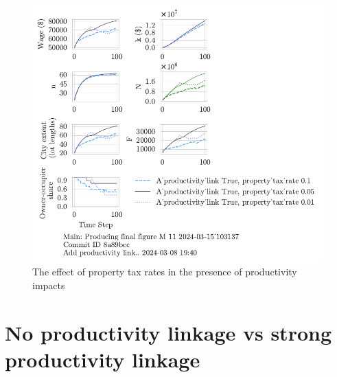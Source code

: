 {%
\begin{figure}[h!tb] 
    \centering
    \includegraphics[scale=.8, trim={0 1.4cm 0 0},clip]{fig/With-productivity_link-property_tax-103137.pdf}  %
    \caption{The effect of property tax rates in the presence of productivity impacts}
    \label{fig:Productivity_link_and_property_tax_ownership_trajectory}
\end{figure}
}

\section{No productivity linkage vs strong productivity linkage }

\newpage
